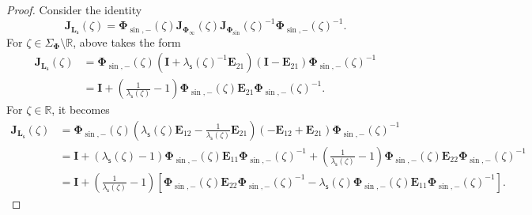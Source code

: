 \documentclass[reqno,a4paper,11pt]{amsart}
\newcommand{\R}{\mathbb{R}}
\renewcommand{\bm}{\mathbf}
\newcommand{\msf}{\mathsf}
\newcommand{\sad}{\msf s}
\theoremstyle{definition}
\theoremstyle{remark}
\numberwithin{equation}{section}
\begin{document}
\begin{proof}
    
    Consider the identity
    \[
        \bm J_{\bm L_{\sad}}(\zeta) = \bm \Phi_{\sin,-}(\zeta) \bm J_{\bm \Phi_\infty}(\zeta) \bm J_{\bm \Phi_{\sin}}(\zeta)^{-1} \bm \Phi_{\sin, -}(\zeta)^{-1}.
    \]
    For $\zeta \in \Sigma_{\bm \Phi} \setminus \R$, above takes the form
    \[
        \begin{split}
        \bm J_{\bm L_{\sad}}(\zeta) 
            &= \bm \Phi_{\sin, -}(\zeta) \left( \bm I + \lambda_{\sad}(\zeta)^{-1} \bm E_{21} \right) \left( \bm I - \bm E_{21}\right) \bm \Phi_{\sin, -}(\zeta)^{-1} \\
            &= \bm I + \left( \frac{1}{\lambda_{\sad}(\zeta)} - 1\right) \bm \Phi_{\sin, -}(\zeta) \bm E_{21} \bm \Phi_{\sin, -}(\zeta)^{-1}.
        \end{split}
    \]
    For $\zeta \in \R$, it becomes
    \[
        \begin{split}
        \bm J_{\bm L_{\sad}}(\zeta) 
            &= \bm \Phi_{\sin, -}(\zeta) \left( \lambda_\sad(\zeta)\bm E_{12} - \frac{1}{\lambda_\sad(\zeta) }\bm E_{21}\right) \left( -\bm E_{12} + \bm E_{21} \right) \bm \Phi_{\sin, -}(\zeta)^{-1} \\
            &= \bm I +  \left( \lambda_\sad(\zeta) - 1\right) \bm \Phi_{\sin, -}(\zeta) \bm E_{11} \bm \Phi_{\sin, -}(\zeta)^{-1}+ \left( \frac{1}{\lambda_\sad(\zeta)} - 1\right) \bm \Phi_{\sin, -}(\zeta) \bm{E}_{22} \bm \Phi_{\sin, -}(\zeta)^{-1} \\
            &= \bm I + \left( \frac{1}{\lambda_\sad(\zeta) }-1\right) \left[ \bm \Phi_{\sin, -}(\zeta) \bm{E}_{22} \bm \Phi_{\sin, -}(\zeta)^{-1}  - \lambda_\sad(\zeta) \bm \Phi_{\sin, -}(\zeta) \bm E_{11} \bm \Phi_{\sin, -}(\zeta)^{-1} \right].
        \end{split}
    \]


\end{proof}
\end{document}
